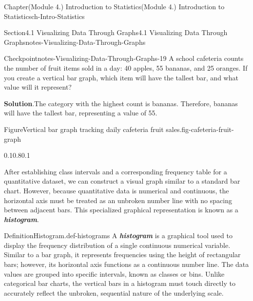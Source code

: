 \documentclass[oneside,10pt,]{book}
\newcommand{\blocktitlefont}{\relax}
\newcommand{\alert}[1]{\textbf{\textit{#1}}}
\begin{document}
\begin{chapterptx}{Chapter}{(Module 4.) Introduction to Statistics}{}{(Module 4.) Introduction to Statistics}{}{}{ch-Intro-Statistics}
\begin{sectionptx}{Section}{4.1 Visualizing Data Through Graphs}{}{4.1 Visualizing Data Through Graphs}{}{}{notes-Visualizing-Data-Through-Graphs}
\begin{inlineexercise}{Checkpoint}{}{notes-Visualizing-Data-Through-Graphs-19}%
A school cafeteria counts the number of fruit items sold in a day: 40 apples, 55 bananas, and 25 oranges. If you create a vertical bar graph, which item will have the tallest bar, and what value will it represent?%
\par\smallskip%
\noindent\textbf{\blocktitlefont Solution}.\hypertarget{notes-Visualizing-Data-Through-Graphs-19-2}{}\quad{}The category with the highest count is bananas. Therefore, bananas will have the tallest bar, representing a value of 55.%
\begin{figureptx}{Figure}{Vertical bar graph tracking daily cafeteria fruit sales.}{fig-cafeteria-fruit-graph}{}%
\begin{image}{0.1}{0.8}{0.1}{}%
%
\end{image}%
\tcblower
\end{figureptx}%
\end{inlineexercise}%
After establishing class intervals and a corresponding frequency table for a quantitative dataset, we can construct a visual graph similar to a standard bar chart. However, because quantitative data is numerical and continuous, the horizontal axis must be treated as an unbroken number line with no spacing between adjacent bars. This specialized graphical representation is known as a \alert{histogram}.%
\begin{definition}{Definition}{Histogram.}{def-histograms}%
A \alert{histogram} is a graphical tool used to display the frequency distribution of a single continuous numerical variable. Similar to a bar graph, it represents frequencies using the height of rectangular bars; however, its horizontal axis functions as a continuous number line. The data values are grouped into specific intervals, known as classes or bins. Unlike categorical bar charts, the vertical bars in a histogram must touch directly to accurately reflect the unbroken, sequential nature of the underlying scale.%

\end{definition}
\end{sectionptx}
\end{chapterptx}
\end{document}
